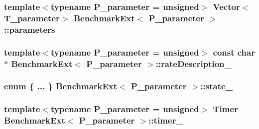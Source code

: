 \subsubsection[{parameters\+\_\+}]{\setlength{\rightskip}{0pt plus 5cm}template$<$typename P\+\_\+parameter  = unsigned$>$ {\bf Vector}$<${\bf T\+\_\+parameter}$>$ {\bf Benchmark\+Ext}$<$ P\+\_\+parameter $>$\+::parameters\+\_\+\hspace{0.3cm}{\ttfamily [protected]}}\label{classBenchmarkExt_a227f3a8ff41b5c86c40aa8b9c6cf7402}
\hypertarget{classBenchmarkExt_aebe65cfdf45cfdb601b2b54059ba7628}{}
\subsubsection[{rate\+Description\+\_\+}]{\setlength{\rightskip}{0pt plus 5cm}template$<$typename P\+\_\+parameter  = unsigned$>$ const char$\ast$ {\bf Benchmark\+Ext}$<$ P\+\_\+parameter $>$\+::rate\+Description\+\_\+\hspace{0.3cm}{\ttfamily [protected]}}\label{classBenchmarkExt_aebe65cfdf45cfdb601b2b54059ba7628}
\hypertarget{classBenchmarkExt_ac79be62db2a83276e89ab21960fd1cf7}{}
\subsubsection[{state\+\_\+}]{\setlength{\rightskip}{0pt plus 5cm}enum \{ ... \}   {\bf Benchmark\+Ext}$<$ P\+\_\+parameter $>$\+::state\+\_\+\hspace{0.3cm}{\ttfamily [protected]}}\label{classBenchmarkExt_ac79be62db2a83276e89ab21960fd1cf7}
\hypertarget{classBenchmarkExt_ab04058d86f083b514773494c17593c0b}{}
\subsubsection[{timer\+\_\+}]{\setlength{\rightskip}{0pt plus 5cm}template$<$typename P\+\_\+parameter  = unsigned$>$ {\bf Timer} {\bf Benchmark\+Ext}$<$ P\+\_\+parameter $>$\+::timer\+\_\+\hspace{0.3cm}{\ttfamily [protected]}}\label{classBenchmarkExt_ab04058d86f083b514773494c17593c0b}
\hypertarget{classBenchmarkExt_ae5e33ddbac604a0ada9c6e95f2d6341d}{}
